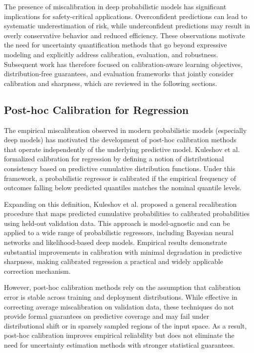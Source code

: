 The presence of miscalibration in deep probabilistic models has significant implications for safety-critical applications. Overconfident predictions can lead to systematic underestimation of risk, while underconfident predictions may result in overly conservative behavior and reduced efficiency. These observations motivate the need for uncertainty quantification methods that go beyond expressive modeling and explicitly address calibration, evaluation, and robustness. Subsequent work has therefore focused on calibration-aware learning objectives, distribution-free guarantees, and evaluation frameworks that jointly consider calibration and sharpness, which are reviewed in the following sections.

\subsection{Post-hoc Calibration for Regression}

The empirical miscalibration observed in modern probabilistic models (especially deep models) has motivated the development of post-hoc calibration methods that operate independently of the underlying predictive model. Kuleshov et al. \cite{kuleshov2018accurate} formalized calibration for regression by defining a notion of distributional consistency based on predictive cumulative distribution functions. Under this framework, a probabilistic regressor is calibrated if the empirical frequency of outcomes falling below predicted quantiles matches the nominal quantile levels.

Expanding on this definition, Kuleshov et al. proposed a general recalibration procedure that maps predicted cumulative probabilities to calibrated probabilities using held-out validation data. This approach is model-agnostic and can be applied to a wide range of probabilistic regressors, including Bayesian neural networks and likelihood-based deep models. Empirical results demonstrate substantial improvements in calibration with minimal degradation in predictive sharpness, making calibrated regression a practical and widely applicable correction mechanism.

However, post-hoc calibration methods rely on the assumption that calibration error is stable across training and deployment distributions. While effective in correcting average miscalibration on validation data, these techniques do not provide formal guarantees on predictive coverage and may fail under distributional shift or in sparsely sampled regions of the input space. As a result, post-hoc calibration improves empirical reliability but does not eliminate the need for uncertainty estimation methods with stronger statistical guarantees.

